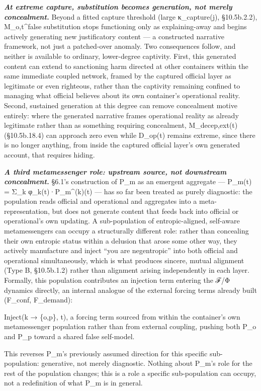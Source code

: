 \documentclass[
]{article}
\begin{document}
\emph{\textbf{At extreme capture, substitution becomes generation, not
merely concealment.}} Beyond a fitted capture threshold (large
κ\_capture(j), §10.5b.2.2), M\_o,t\^{}false substitution stops
functioning only as explaining-away and begins actively generating new
justificatory content --- a constructed narrative framework, not just a
patched-over anomaly. Two consequences follow, and neither is available
to ordinary, lower-degree captivity. First, this generated content can
extend to sanctioning harm directed at other containers within the same
immediate coupled network, framed by the captured official layer as
legitimate or even righteous, rather than the captivity remaining
confined to managing what official believes about its own container's
operational reality. Second, sustained generation at this degree can
remove concealment motive entirely: where the generated narrative frames
operational reality as already legitimate rather than as something
requiring concealment, M\_decep,ext(t) (§10.5b.18.4) can approach zero
even while D\_op(t) remains extreme, since there is no longer anything,
from inside the captured official layer's own generated account, that
requires hiding.

\emph{\textbf{A third metamessenger role: upstream source, not
downstream concealment.}} §6.1's construction of P\_m as an emergent
aggregate --- P\_m(t) = Σ\_k φ\_k(t)·P\_m\^{}(k)(t) --- has so far been
treated as purely diagnostic: the population reads official and
operational and aggregates into a meta-representation, but does not
generate content that feeds back into official or operational's own
updating. A sub-population of entropic-aligned, self-aware
metamessengers can occupy a structurally different role: rather than
concealing their own entropic status within a delusion that arose some
other way, they actively manufacture and inject ``you are negentropic''
into both official and operational simultaneously, which is what
produces sincere, mutual alignment (Type B, §10.5b.1.2) rather than
alignment arising independently in each layer. Formally, this population
contributes an injection term entering the ℱ/Φ dynamics directly, an
internal analogue of the external forcing terms already built (F\_conf,
F\_demand):

Inject(k → \{o,p\}, t), a forcing term sourced from within the
container's own metamessenger population rather than from external
coupling, pushing both P\_o and P\_p toward a shared false self-model.

This reverses P\_m's previously assumed direction for this specific
sub-population: generative, not merely diagnostic. Nothing about P\_m's
role for the rest of the population changes; this is a role a specific
sub-population can occupy, not a redefinition of what P\_m is in
general.
\end{document}
